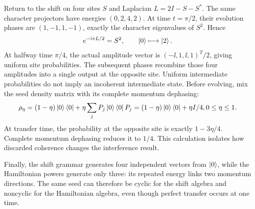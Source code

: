 Return to the shift on four sites $S$ and Laplacian $L=2I-S-S^*$. The same character projectors have energies $(0,2,4,2)$. At time $t=\pi/2$, their evolution phases are $(1,-1,1,-1)$, exactly the character eigenvalues of $S^2$. Hence
\[
e^{-\ii\pi L/2}=S^2,\qquad
\ket0\longmapsto\ket2.
\]
At halfway time $\pi/4$, the actual amplitude vector is $(-\ii,1,\ii,1)^T/2$, giving uniform site probabilities. The subsequent phases recombine those four amplitudes into a single output at the opposite site. Uniform intermediate probabilities do not imply an incoherent intermediate state.
Before evolving, mix the seed density matrix with its complete momentum dephasing:
\[
\rho_\eta=(1-\eta)\left|0\right\rangle\left\langle0\right|+\eta\sum_jP_j\left|0\right\rangle\left\langle0\right|P_j
=(1-\eta)\left|0\right\rangle\left\langle0\right|+\eta I/4,
0\le\eta\le1.
\]
At transfer time, the probability at the opposite site is exactly $1-3\eta/4$. Complete momentum dephasing reduces it to $1/4$. This calculation isolates how discarded coherence changes the interference result.

Finally, the shift grammar generates four independent vectors from $\left|0\right\rangle$, while the Hamiltonian powers generate only three: its repeated energy links two momentum directions. The same seed can therefore be cyclic for the shift algebra and noncyclic for the Hamiltonian algebra, even though perfect transfer occurs at one time.

